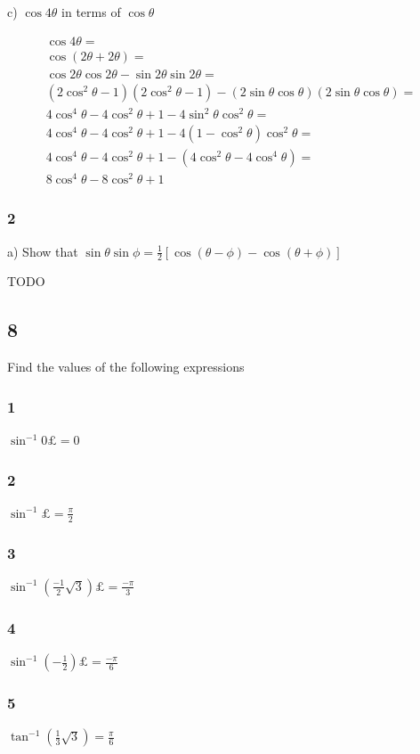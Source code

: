\documentclass[]{report}
\begin{document}
c) $\cos4\theta$ in terms of $\cos \theta$

\begin{align*}
\cos4\theta = \\
\cos(2\theta + 2\theta) = \\
\cos2\theta\cos2\theta - \sin2\theta\sin2\theta = \\
 (2\cos^2\theta -1)(2\cos^2\theta - 1) - (2\sin\theta\cos\theta)(2\sin\theta\cos\theta) = \\
 4\cos^4\theta -4\cos^2\theta + 1 - 4\sin^2\theta\cos^2\theta = \\
 4\cos^4\theta -4\cos^2\theta + 1 - 4(1 - \cos^2\theta)\cos^2\theta = \\
 4\cos^4\theta -4\cos^2\theta + 1 - (4\cos^2\theta - 4\cos^4\theta) = \\
 8\cos^4\theta  - 8\cos^2\theta + 1
\end{align*}

\subsubsection{2}

a) Show that $\sin\theta\sin\phi = \frac{1}{2}[\cos(\theta-\phi) - \cos(\theta+\phi)]$

TODO

\subsection{8}
Find the values of the following expressions

\subsubsection{1}
$\sin^{-1}0£ = 0$
\subsubsection{2}
$\sin^{-1}£ = \frac{\pi}{2}$
\subsubsection{3}
$\sin^{-1}(\frac{-1}{2}\sqrt{3})£ = \frac{-\pi}{3}$
\subsubsection{4}
$\sin^{-1}(-\frac{1}{2})£ = \frac{-\pi}{6}$
\subsubsection{5}
$\tan^{-1}(\frac{1}{3}\sqrt{3}) =\frac{\pi}{6} $
\end{document}
